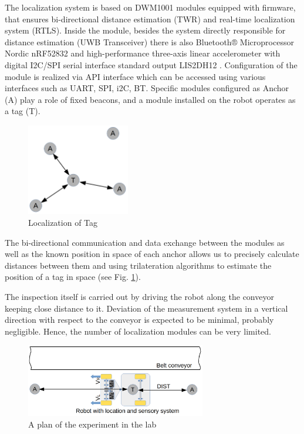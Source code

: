 \documentclass[3p,times,12pt]{elsarticle}
\begin{document}
The localization system is based on DWM1001 modules equipped with firmware, that ensures bi-directional distance estimation (TWR) and real-time localization system (RTLS). Inside the module, besides the system directly responsible for distance estimation (UWB Transceiver) there is also Bluetooth® Microprocessor Nordic nRF52832 and high-performance three-axis linear accelerometer with digital I2C/SPI serial interface standard output LIS2DH12 \cite{dwm1001}. Configuration of the module is realized via API interface which can be accessed using various interfaces such as UART, SPI, i2C, BT. Specific modules configured as Anchor (A) play a role of fixed beacons, and a module installed on the robot operates as a tag (T).


\begin{figure}[ht!]
	\centering
	\includegraphics[width=0.4\textwidth]{RTLS_Tagi_Kotwice.PNG}
	\caption{Localization of Tag}
	\label{fig:RTLS}
\end{figure}

The bi-directional communication and data exchange between the modules as well as the known position in space of each anchor allows us to precisely calculate distances between them and using trilateration algorithms to estimate the position of a tag in space (see Fig. \ref{fig:RTLS}). 

The inspection itself is carried out by driving the robot along the conveyor keeping close distance to it. Deviation of the measurement system in a vertical direction with respect to the conveyor is expected to be minimal, probably negligible. Hence, the number of localization modules can be very limited.


\begin{figure}[ht!]
	\centering
	\includegraphics[width=0.7\textwidth]{RTLS_przenosnik_robot.PNG}
	\caption{A plan of the experiment in the lab}
	\label{fig:plan_exp}
\end{figure}
\end{document}
